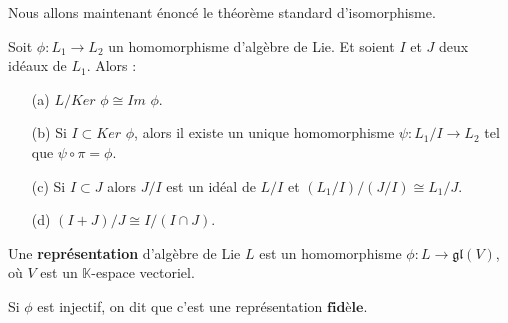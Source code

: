 \documentclass[a4paper,openany,12pt]{report}
\newcommand{\KK}{\mathbb{K}}
\newcommand{\gl}{\mathfrak{gl}}
\theoremstyle{break}
{\theorembodyfont{\upshape}
\newtheorem*{rmq}{Remarque :}
\newtheorem*{prv}{Preuve :}
\newtheorem*{ex}{Exemples :}
\newtheorem{exe}{Exemple : }
\newtheorem*{nota}{Notation :}}
\begin{document}
\quad Nous allons maintenant énoncé le théorème standard d'isomorphisme.

\begin{thm}\label{thm:iso}
Soit $\phi: L_{1}  \to L_{2} $ un homomorphisme d'algèbre de Lie. Et soient $I$ et $J$ deux idéaux de $L_{1}$.
Alors :
\begin{itemize}
\item[(a)] $L / Ker$ $\phi \cong Im$ $\phi$.
\item[(b)] Si $I \subset Ker$ $\phi$, alors il existe un unique homomorphisme $\psi: L_{1} / I \to L_{2} $ tel que $\psi \circ \pi= \phi$.
\item[(c)] Si $I \subset J$ alors $J / I$ est un idéal de $L/ I$ et $(L_{1} / I) /(J / I)\cong L_{1} / J$.
\item[(d)] $(I+J) / J \cong I /(I \cap J)$.
\end{itemize}
\end{thm}

\begin{df}
\quad  Une \textbf{représentation} d’algèbre de Lie $L$ est un homomorphisme $\phi: L \rightarrow \gl(V)$, où $V$ est un $\KK$-espace vectoriel.

Si $\phi$ est injectif, on dit que c'est une représentation  $\textbf{fidèle}$.
\end{df}
\end{document}

